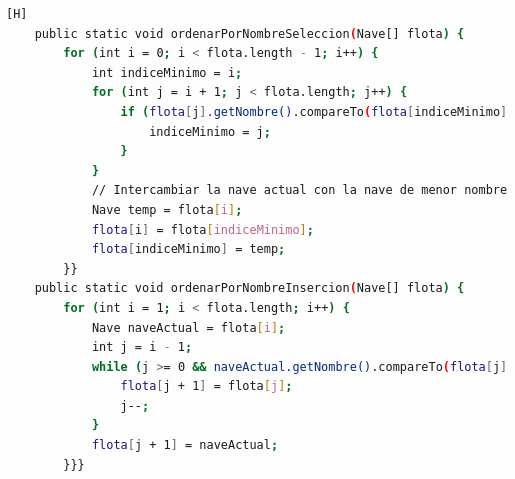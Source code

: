\documentclass{article}
\begin{document}
\begin{lstlisting}[language=bash,caption={Creando la clase Ejercito_vs}][H]
    public static void ordenarPorNombreSeleccion(Nave[] flota) {
        for (int i = 0; i < flota.length - 1; i++) {
            int indiceMinimo = i;
            for (int j = i + 1; j < flota.length; j++) {
                if (flota[j].getNombre().compareTo(flota[indiceMinimo].getNombre()) < 0) {
                    indiceMinimo = j;
                }
            }
            // Intercambiar la nave actual con la nave de menor nombre
            Nave temp = flota[i];
            flota[i] = flota[indiceMinimo];
            flota[indiceMinimo] = temp;
        }}
    public static void ordenarPorNombreInsercion(Nave[] flota) {
        for (int i = 1; i < flota.length; i++) {
            Nave naveActual = flota[i];
            int j = i - 1;
            while (j >= 0 && naveActual.getNombre().compareTo(flota[j].getNombre()) < 0) {
                flota[j + 1] = flota[j];
                j--;
            }
            flota[j + 1] = naveActual;
        }}}


	
	
				\end{lstlisting}
			
\end{document}
